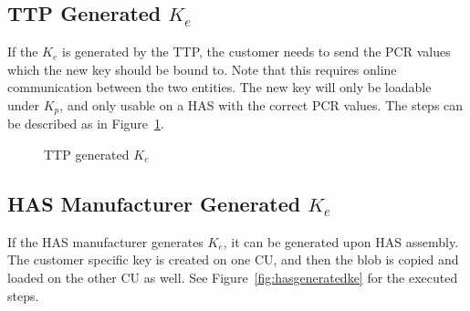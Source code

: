 {\subsection{TTP Generated $K_e$} \label{sec:ttpgeneratedke}
If the $K_e$ is generated by the TTP, the customer needs to send the PCR values which the new key should be bound to. Note that this requires online communication between the two entities. The new key will only be loadable under $K_p$, and only usable on a HAS with the correct PCR values. The steps can be described as in Figure~\ref{fig:ttpgeneratedke}.
\begin{figure}[hbtp]
	\centering
	\caption{TTP generated $K_e$}
	\label{fig:ttpgeneratedke}
\end{figure}

\subsection{HAS Manufacturer Generated $K_e$} \label{sec:hasgeneratedke}
If the HAS manufacturer generates $K_e$, it can be generated upon HAS assembly. The customer specific key is created on one CU, and then the blob is copied and loaded on the other CU as well. See Figure~\ref{fig:hasgeneratedke} for the executed steps.
\begin{figure}[hbtp]
	\centering
\end{figure}}
